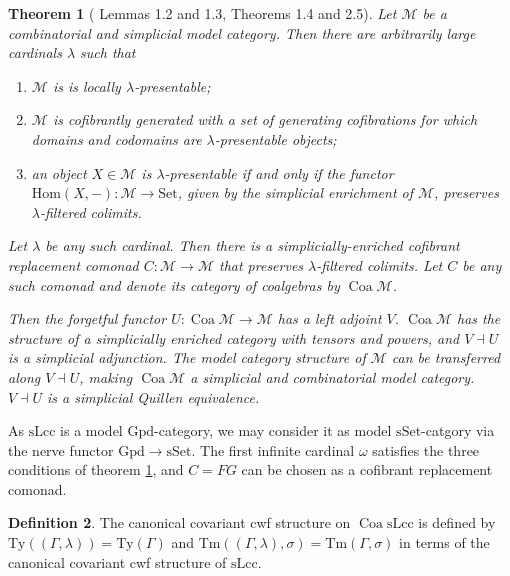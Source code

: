 \documentclass[a4paper]{article}
\newtheorem{theorem}{Theorem}
\theoremstyle{remark}
\theoremstyle{definition}
\newtheorem{definition}[theorem]{Definition}
\begin{document}
\begin{theorem}[\cite{coalgebraic-models} Lemmas 1.2 and 1.3, Theorems 1.4 and 2.5]
  \label{th:coalgebraic-model-category}
  Let $\mathcal{M}$ be a combinatorial and simplicial model category.
  Then there are arbitrarily large cardinals $\lambda$ such that
  \begin{enumerate}
    \item
      $\mathcal{M}$ is is locally $\lambda$-presentable;
    \item
      $\mathcal{M}$ is cofibrantly generated with a set of generating cofibrations for which domains and codomains are $\lambda$-presentable objects;
    \item
      an object $X \in \mathcal{M}$ is $\lambda$-presentable if and only if the functor $\mathrm{Hom}(X, -) : \mathcal{M} \rightarrow \mathrm{Set}$, given by the simplicial enrichment of $\mathcal{M}$, preserves $\lambda$-filtered colimits.
  \end{enumerate}

  Let $\lambda$ be any such cardinal.
  Then there is a simplicially-enriched cofibrant replacement comonad $C : \mathcal{M} \rightarrow \mathcal{M}$ that preserves $\lambda$-filtered colimits. 
  Let $C$ be any such comonad and denote its category of coalgebras by $\operatorname{Coa} \mathcal{M}$.

  Then the forgetful functor $U : \operatorname{Coa} \mathcal{M} \rightarrow \mathcal{M}$ has a left adjoint $V$.
  $\operatorname{Coa} \mathcal{M}$ has the structure of a simplicially enriched category with tensors and powers, and $V \dashv U$ is a simplicial adjunction.
  The model category structure of $\mathcal{M}$ can be transferred along $V \dashv U$, making $\operatorname{Coa} \mathcal{M}$ a simplicial and combinatorial model category.
  $V \dashv U$ is a simplicial Quillen equivalence.
\end{theorem}

As $\mathrm{sLcc}$ is a model $\mathrm{Gpd}$-category, we may consider it as model $\mathrm{sSet}$-catgory via the nerve functor $\mathrm{Gpd} \rightarrow \mathrm{sSet}$.
The first infinite cardinal $\omega$ satisfies the three conditions of theorem \ref{th:coalgebraic-model-category}, and $C = FG$ can be chosen as a cofibrant replacement comonad.

\begin{definition}
  The canonical covariant cwf structure on $\operatorname{Coa} \mathrm{sLcc}$ is defined by $\mathrm{Ty}((\Gamma, \lambda)) = \mathrm{Ty}(\Gamma)$ and $\mathrm{Tm}((\Gamma, \lambda), \sigma) = \mathrm{Tm}(\Gamma, \sigma)$ in terms of the canonical covariant cwf structure of $\mathrm{sLcc}$.
\end{definition}
\end{document}
